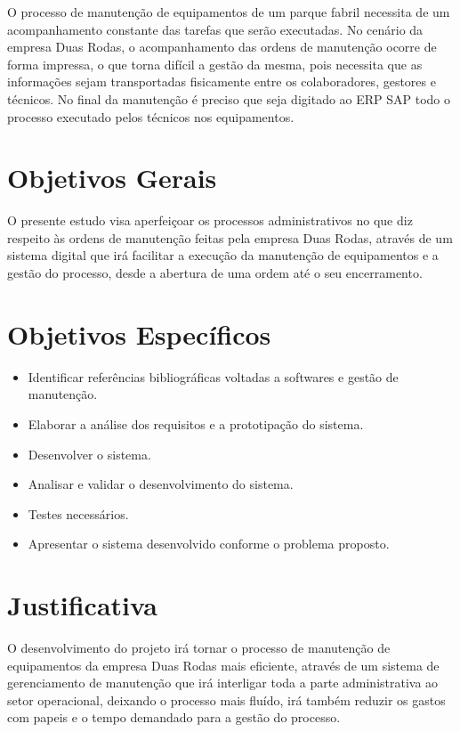 O processo de manutenção de equipamentos de um parque fabril necessita de um acompanhamento constante das tarefas que serão executadas. No cenário da empresa Duas Rodas, o acompanhamento das ordens de manutenção ocorre de 
forma impressa, o que torna difícil a gestão da mesma, pois necessita que as informações sejam transportadas fisicamente entre os colaboradores, gestores e técnicos. No final da manutenção é preciso que seja digitado ao ERP SAP todo o processo executado pelos técnicos nos equipamentos.

\section{Objetivos Gerais}

O presente estudo visa aperfeiçoar os processos administrativos no que diz respeito às ordens de manutenção feitas pela empresa Duas Rodas, através de um sistema digital que irá facilitar a execução da manutenção de equipamentos e a gestão do processo, desde a abertura de uma ordem até o seu encerramento.

\section{Objetivos Específicos}

\begin{itemize}
	\item Identificar referências bibliográficas voltadas a softwares e gestão de manutenção.
	\item Elaborar a análise dos requisitos e a prototipação do sistema.
	\item Desenvolver o sistema.
	\item Analisar e validar o desenvolvimento do sistema.
	\item Testes necessários.
	\item Apresentar o sistema desenvolvido conforme o problema proposto.
\end{itemize}


\section{Justificativa}

O desenvolvimento do projeto irá tornar o processo de manutenção de equipamentos da empresa Duas Rodas mais eficiente, através de um sistema de gerenciamento de manutenção que irá interligar toda a parte administrativa ao setor operacional, deixando o processo mais fluído, irá também reduzir os gastos com papeis e o tempo demandado para a gestão do processo.


